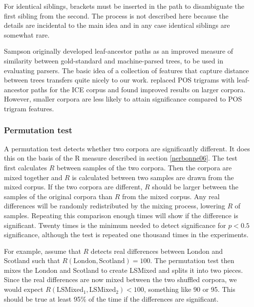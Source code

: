 \documentclass[11pt]{article}
\begin{document}
For identical siblings, brackets must be inserted in the path to
disambiguate the first sibling from the second. The process is not
described here because the details are incidental to the main idea and
in any case identical siblings are somewhat rare.

Sampson originally developed leaf-ancestor paths as an improved
measure of similarity between gold-standard and machine-parsed trees,
to be used in evaluating parsers. The basic idea of a collection of
features that capture distance between trees transfers quite nicely to
our work.  replaced POS trigrams with
leaf-ancestor paths for the ICE corpus and found improved results on
larger corpora. However, smaller corpora are less likely to attain
significance compared to POS trigram features.


\subsubsection{Permutation test}
\label{permutationtest}

A permutation test detects whether two corpora are significantly
different. It does this on the basis of the R measure described in
section \ref{nerbonne06}. The test first calculates $R$ between
samples of the two corpora. Then the corpora are mixed together and
$R$ is calculated between two samples are drawn from the mixed
corpus. If the two corpora are different, $R$ should be larger between
the samples of the original corpora than $R$ from the mixed
corpus. Any real differences will be randomly redistributed by the
mixing process, lowering $R$ of samples. Repeating this comparison
enough times will show if the difference is significant. Twenty times
is the minimum needed to detect significance for $p < 0.5$
significance, although the test is repeated one thousand times in the
experiments.

For example, assume that $R$ detects real differences between London
and Scotland such that $R(\textrm{London},\textrm{Scotland}) =
100$. The permutation test then mixes the London and Scotland to
create LSMixed and splits it into two pieces. Since the real
differences are now mixed between the two shuffled corpora, we
would expect $R(\textrm{LSMixed}_1, \textrm{LSMixed}_2) < 100$, something
like 90 or 95. This should be true at least 95\% of the time if the
differences are significant.
\end{document}
